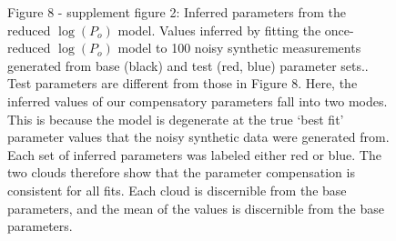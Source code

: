 \documentclass{article}
\newcommand\Po{P_o}
\newcommand\lpo{\log(\Po)}
\begin{document}
\begin{figure}
\captionsetup{labelformat=empty,width=1.1\linewidth}
\caption{Figure 8 - supplement figure 2: Inferred parameters from the reduced $\lpo$ model. Values inferred by fitting the once-reduced $\lpo$ model to 100 noisy synthetic measurements generated from base (black) and test (red, blue) parameter sets..  Test parameters are different from those in Figure 8.  Here, the inferred values of our compensatory parameters fall into two modes.  This is because the model is degenerate at the true `best fit' parameter values that the noisy synthetic data were generated from.  Each set of inferred parameters was labeled either red or blue.  The two clouds therefore show that the parameter compensation is consistent for all fits.  Each cloud is discernible from the base parameters, and the mean of the values is discernible from the base parameters.}



\end{figure}

\addtocounter{figure}{-1}
\end{document}
